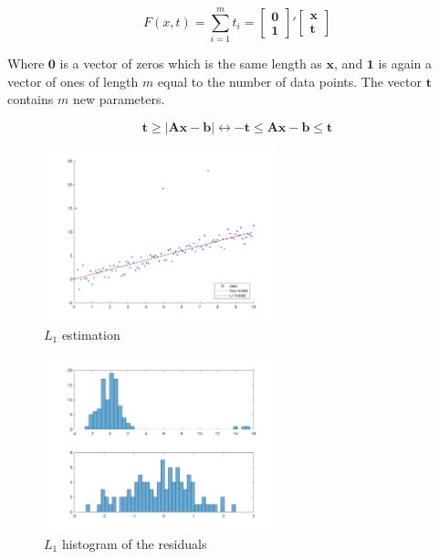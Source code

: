 \begin{equation}
F(x,t) =  \sum_{i=1}^{m} t_i = \begin{bmatrix}
\mathbf{0} \\
\mathbf{1}
\end{bmatrix}' 
\begin{bmatrix}
\mathbf{x} \\
\mathbf{t}
\end{bmatrix}
\label{eq:l1estimation3}
\end{equation}

Where $\mathbf{0}$ is a vector of zeros which is the same length as $\mathbf{x}$, and $\mathbf{1}$ is again a vector of ones of length $m$ equal to the number of data points. The vector $\mathbf{t}$ contains $m$ new parameters.

\[
\mathbf{t} \geq \vert \mathbf{A} \mathbf{x} - \mathbf{b} \vert \leftrightarrow -\mathbf{t} \leq \mathbf{A x} - \mathbf{b} \leq \mathbf{t}
\]

\begin{figure}[H]
\centering
\includegraphics[width=0.6\textwidth]{../img/L1_norm}
\caption{$L_1$ estimation}
\label{fig:l1estimation}
\end{figure}

\begin{figure}[htb]
\centering
\includegraphics[width=0.6\textwidth]{../img/L1_hist}
\caption{$L_1$ histogram of the residuals}
\label{fig:l1Hist}
\end{figure}	


